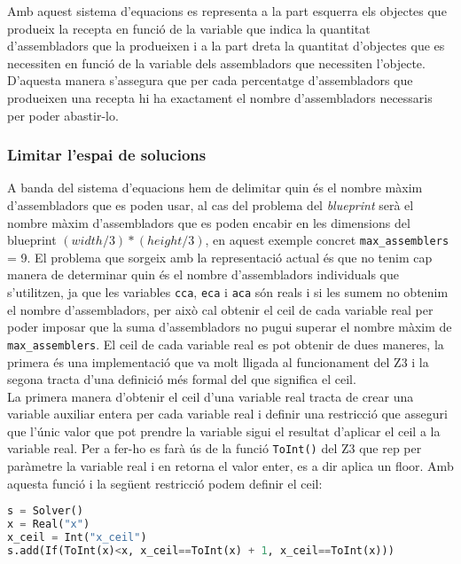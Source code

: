 Amb aquest sistema d'equacions es representa a la part esquerra els objectes que produeix la recepta en funció de la variable que indica la quantitat d'assembladors que la produeixen i a la part dreta la quantitat d'objectes que es necessiten en funció de la variable dels assembladors que necessiten l'objecte. D'aquesta manera s'assegura que per cada percentatge d'assembladors que produeixen una recepta hi ha exactament el nombre d'assembladors necessaris per poder abastir-lo.\\

\subsubsection{Limitar l'espai de solucions}
A banda del sistema d'equacions hem de delimitar quin és el nombre màxim d'assembladors que es poden usar, al cas del problema del \textit{blueprint} serà el nombre màxim d'assembladors que es poden encabir en les dimensions del blueprint $(width/3) * (height/3)$, en aquest exemple concret \lstinline{max_assemblers} = 9. El problema que sorgeix amb la representació actual és que no tenim cap manera de determinar quin és el nombre d'assembladors individuals que s'utilitzen, ja que les variables \lstinline{cca}, \lstinline{eca} i \lstinline{aca} són reals i si les sumem no obtenim el nombre d'assembladors, per això cal obtenir el ceil de cada variable real per poder imposar que la suma d'assembladors no pugui superar el nombre màxim de \lstinline{max_assemblers}. El ceil de cada variable real es pot obtenir de dues maneres, la primera és una implementació que va molt lligada al funcionament del Z3 i la segona tracta d'una definició més formal del que significa el ceil.\\

La primera manera d'obtenir el ceil d'una variable real tracta de crear una variable auxiliar entera per cada variable real i definir una restricció que asseguri que l'únic valor que pot prendre la variable sigui el resultat d'aplicar el ceil a la variable real. Per a fer-ho es farà ús de la funció \lstinline{ToInt()} del Z3 que rep per paràmetre la variable real i en retorna el valor enter, es a dir aplica un floor. Amb aquesta funció i la següent restricció podem definir el ceil:

\begin{lstlisting}[language=Python, caption=Ceil implementation 1]
s = Solver()
x = Real("x")
x_ceil = Int("x_ceil")
s.add(If(ToInt(x)<x, x_ceil==ToInt(x) + 1, x_ceil==ToInt(x)))
\end{lstlisting}

